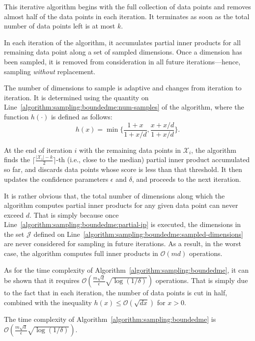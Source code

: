 This iterative algorithm begins with
the full collection of data points and removes almost half of the data points
in each iteration. It terminates as soon as the total number of data points left
is at most $k$.

In each iteration of the algorithm, it accumulates partial inner products
for all remaining data point along a set of sampled dimensions. Once a dimension
has been sampled, it is removed from consideration in all future
iterations---hence, sampling \emph{without} replacement.

The number of dimensions to sample is adaptive and changes from iteration to iteration.
It is determined using the quantity on Line~\ref{algorithm:sampling:boundedme:num-samples}
of the algorithm, where the function $h(\cdot)$ is defined as follows:
\begin{equation}
    \label{equation:sampling:boundedme:h}
    h(x) = \min \Big\{ \frac{1 + x}{1 + x/d}, \frac{x + x/d}{1 + x/d} \Big\}.
\end{equation}

At the end of iteration $i$ with the remaining data points in $\mathcal{X}_i$, the algorithm finds the
$\lceil \frac{\lvert \mathcal{X}_i \rvert - k}{2} \rceil$-th (i.e., close to the median)
partial inner product accumulated so far, and discards data points whose
score is less than that threshold. It then updates the confidence parameters
$\epsilon$ and $\delta$, and proceeds to the next iteration.

It is rather obvious that, the total number of dimensions along which
the algorithm computes partial inner products for any given data point
can never exceed $d$. That is simply because once
Line~\ref{algorithm:sampling:boundedme:partial-ip} is executed,
the dimensions in the set $\mathcal{J}$ defined on
Line~\ref{algorithm:sampling:boundedme:sampled-dimensions}
are never considered for sampling
in future iterations. As a result, in the worst case, the algorithm computes
full inner products in $\mathcal{O}(md)$ operations.

As for the time complexity of Algorithm~\ref{algorithm:sampling:boundedme},
it can be shown that it requires $\mathcal{O}(\frac{m \sqrt{d}}{\epsilon} \sqrt{\log(1/\delta)})$
operations. That is simply due to the fact that in each iteration,
the number of data points is cut in half, combined with the inequality
$h(x) \leq \mathcal{O}(\sqrt{dx})$ for $x > 0$.

\begin{theorem}
    \label{theorem:sampling:boundedme:complexity}
    The time complexity of Algorithm~\ref{algorithm:sampling:boundedme}
    is $\mathcal{O}(\frac{m \sqrt{d}}{\epsilon} \sqrt{\log(1/\delta)})$.
\end{theorem}

